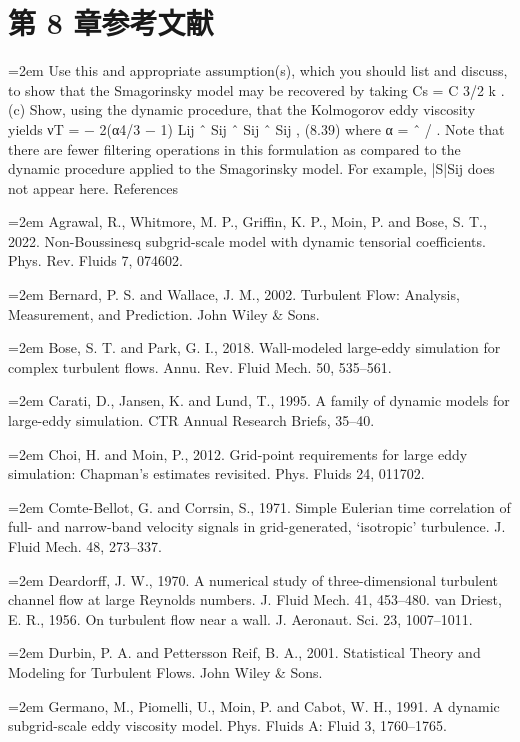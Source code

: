 \documentclass[12pt,a4paper,openany,fontset=none]{ctexbook}
\begin{document}
\section*{第 8 章参考文献}
\par\hangindent=2em Use this and appropriate assumption(s), which you should list and discuss, to show that the Smagorinsky model may be recovered by taking Cs = C 3/2 k . (c) Show, using the dynamic procedure, that the Kolmogorov eddy viscosity yields νT = − 2(α4/3 − 1) Lij ˆ Sij ˆ Sij ˆ Sij , (8.39) where α = ˆ / . Note that there are fewer filtering operations in this formulation as compared to the dynamic procedure applied to the Smagorinsky model. For example,   |S|Sij does not appear here. References
\par\hangindent=2em Agrawal, R., Whitmore, M. P., Griffin, K. P., Moin, P. and Bose, S. T., 2022. Non-Boussinesq subgrid-scale model with dynamic tensorial coefficients. Phys. Rev. Fluids 7, 074602.
\par\hangindent=2em Bernard, P. S. and Wallace, J. M., 2002. Turbulent Flow: Analysis, Measurement, and Prediction. John Wiley \& Sons.
\par\hangindent=2em Bose, S. T. and Park, G. I., 2018. Wall-modeled large-eddy simulation for complex turbulent flows. Annu. Rev. Fluid Mech. 50, 535–561.
\par\hangindent=2em Carati, D., Jansen, K. and Lund, T., 1995. A family of dynamic models for large-eddy simulation. CTR Annual Research Briefs, 35–40.
\par\hangindent=2em Choi, H. and Moin, P., 2012. Grid-point requirements for large eddy simulation: Chapman’s estimates revisited. Phys. Fluids 24, 011702.
\par\hangindent=2em Comte-Bellot, G. and Corrsin, S., 1971. Simple Eulerian time correlation of full- and narrow-band velocity signals in grid-generated, ‘isotropic’ turbulence. J. Fluid Mech. 48, 273–337.
\par\hangindent=2em Deardorff, J. W., 1970. A numerical study of three-dimensional turbulent channel flow at large Reynolds numbers. J. Fluid Mech. 41, 453–480. van Driest, E. R., 1956. On turbulent flow near a wall. J. Aeronaut. Sci. 23, 1007–1011.
\par\hangindent=2em Durbin, P. A. and Pettersson Reif, B. A., 2001. Statistical Theory and Modeling for Turbulent Flows. John Wiley \& Sons.
\par\hangindent=2em Germano, M., Piomelli, U., Moin, P. and Cabot, W. H., 1991. A dynamic subgrid-scale eddy viscosity model. Phys. Fluids A: Fluid 3, 1760–1765.
\end{document}
